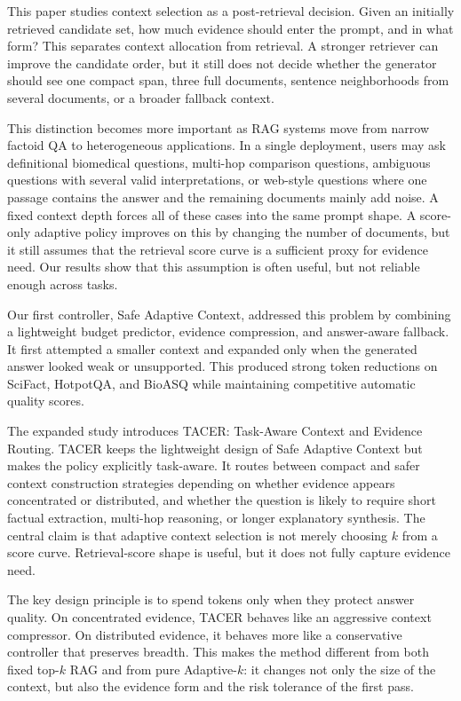 \documentclass[11pt]{article}
\begin{document}
This paper studies context selection as a post-retrieval decision. Given an initially retrieved candidate set, how much evidence should enter the prompt, and in what form? This separates context allocation from retrieval. A stronger retriever can improve the candidate order, but it still does not decide whether the generator should see one compact span, three full documents, sentence neighborhoods from several documents, or a broader fallback context.

This distinction becomes more important as RAG systems move from narrow factoid QA to heterogeneous applications. In a single deployment, users may ask definitional biomedical questions, multi-hop comparison questions, ambiguous questions with several valid interpretations, or web-style questions where one passage contains the answer and the remaining documents mainly add noise. A fixed context depth forces all of these cases into the same prompt shape. A score-only adaptive policy improves on this by changing the number of documents, but it still assumes that the retrieval score curve is a sufficient proxy for evidence need. Our results show that this assumption is often useful, but not reliable enough across tasks.

Our first controller, Safe Adaptive Context, addressed this problem by combining a lightweight budget predictor, evidence compression, and answer-aware fallback. It first attempted a smaller context and expanded only when the generated answer looked weak or unsupported. This produced strong token reductions on SciFact, HotpotQA, and BioASQ while maintaining competitive automatic quality scores.

The expanded study introduces TACER: Task-Aware Context and Evidence Routing. TACER keeps the lightweight design of Safe Adaptive Context but makes the policy explicitly task-aware. It routes between compact and safer context construction strategies depending on whether evidence appears concentrated or distributed, and whether the question is likely to require short factual extraction, multi-hop reasoning, or longer explanatory synthesis. The central claim is that adaptive context selection is not merely choosing $k$ from a score curve. Retrieval-score shape is useful, but it does not fully capture evidence need.

The key design principle is to spend tokens only when they protect answer quality. On concentrated evidence, TACER behaves like an aggressive context compressor. On distributed evidence, it behaves more like a conservative controller that preserves breadth. This makes the method different from both fixed top-$k$ RAG and from pure Adaptive-$k$: it changes not only the size of the context, but also the evidence form and the risk tolerance of the first pass.
\end{document}
